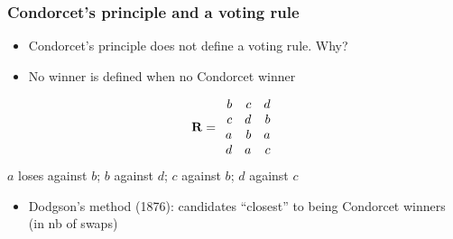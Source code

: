 \documentclass[french,english]{beamer}
\begin{document}
\begin{frame}
	\frametitle{Condorcet’s principle and a voting rule}
	\begin{itemize}
		\item Condorcet’s principle does not define a voting rule. Why? \pause
		\item No winner is defined when no Condorcet winner
	\end{itemize}
	\begin{equation}
		\mathbf{R} =
		\begin{array}{rrr}
			b	&	c	&	d\\
			c	&	d	&	b\\
			a	&	b	&	a\\
			d	&	a	&	c
		\end{array}
	\end{equation}
	\pause
	$a$ loses against $b$; $b$ against $d$; $c$ against $b$; $d$ against $c$
	\begin{itemize}
		\item Dodgson’s method (1876): candidates “closest” to being Condorcet winners {\tiny (in nb of swaps)}
	\end{itemize}
\end{frame}
\end{document}
